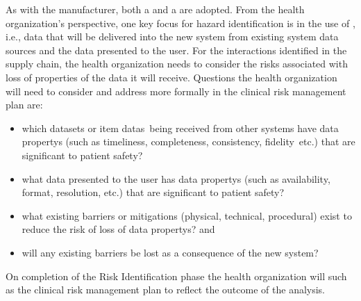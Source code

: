 As with the manufacturer, both a  and a  are adopted. From the health organization's perspective, one key focus for \gls{hazard} identification is in the use of , i.e., data that will be delivered into the new system from existing system data sources and the data presented to the user. For the interactions identified in the supply chain, the health organization needs to consider the risks associated with loss of properties of the data it will receive. Questions the health organization will need to consider and address more formally in the clinical risk management plan are:
\clearpage%
\begin{itemize}
  \item which \glspl{dataset} or \cbstart\glspl{item data}\cbend\ being received from other systems have \glspl{data property} (such as \gls{timeliness}, \gls{completeness}, \gls{consistency}, \cbstart\gls{fidelity}\cbend\ etc.) that are significant to patient safety? 
  \item what data presented to the user has \glspl{data property} (such as \gls{availability}, format, \gls{resolution}, etc.) that are significant to patient safety?
  \item what existing barriers or mitigations (physical, technical, procedural) exist to reduce the risk of loss of \glspl{data property}? and
  \item will any existing barriers be lost as a consequence of the new system?
\end{itemize}

On completion of the Risk Identification phase the health organization will  such as the clinical risk management plan to reflect the outcome of the analysis.

